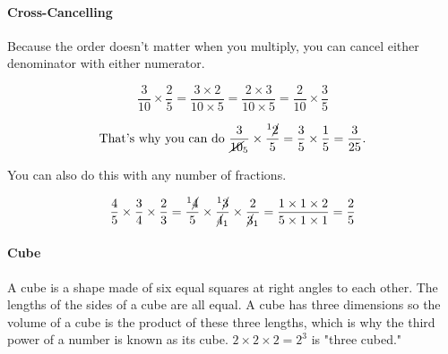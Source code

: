 \documentclass[12pt]{article}
\begin{document}
\paragraph{Cross-Cancelling}
Because the order doesn't matter when you multiply, you can cancel either denominator with either numerator.

$$\frac{3}{10} \times \frac{2}{5} = \frac{{3 \times 2}}{{10 \times 5}} = \frac{{2 \times 3}}{{10 \times 5}} = \frac{2}{10} \times \frac{3}{5}$$

$$\text{That's why you can do }\frac{3}{{\cancel{10}_5}} \times \frac{{^1\cancel{2}}}{5} = \frac{3}{5} \times \frac{1}{5} = \frac{3}{25}\text{.}$$

You can also do this with any number of fractions.

$$\frac{4}{5} \times \frac{3}{4} \times \frac{2}{3} = \frac{{^1\cancel{4}}}{5} \times \frac{{^1\cancel{3}}}{{\cancel{4}_1}} \times \frac{2}{{\cancel{3}_1}} = \frac{1 \times 1 \times2}{5 \times 1 \times 1} = \frac{2}{5}$$

\paragraph{Cube}
A cube is a shape made of six equal squares at right angles to each other. The lengths of the sides of a cube are all equal.
A cube has three dimensions so the volume of a cube is the product of these three lengths, which is why the third power of a number is known as its cube. $2\times2\times2=2^3$ is "three cubed."

\begin{center}
\end{center}
\end{document}
